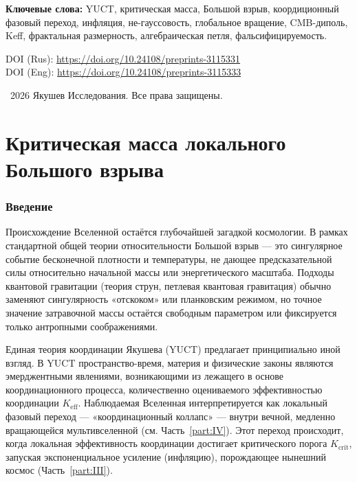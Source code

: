 \documentclass[11pt,a4paper]{article}
\begin{document}
	\vspace{0.1cm}
	\noindent
	{\color{darkblue}\textbf{Ключевые слова:}} YUCT, критическая масса, Большой взрыв, коордиционный фазовый переход, инфляция, не-гауссовость, глобальное вращение, CMB-диполь, Keff, фрактальная размерность, алгебраическая петля, фальсифицируемость.
	
	DOI (Rus): \url{https://doi.org/10.24108/preprints-3115331} \\
	DOI (Eng): \url{https://doi.org/10.24108/preprints-3115333}
	
	\vspace{0.5cm}
	\noindent
	\textcopyright\ 2026 Якушев Исследования. Все права защищены.
	
	
	\clearpage
	\tableofcontents
	\newpage
	
	\part{Критическая масса локального Большого взрыва}
	\label{part:I}
	
	\section{Введение}
	
	Происхождение Вселенной остаётся глубочайшей загадкой космологии. В рамках стандартной общей теории относительности Большой взрыв — это сингулярное событие бесконечной плотности и температуры, не дающее предсказательной силы относительно начальной массы или энергетического масштаба. Подходы квантовой гравитации (теория струн, петлевая квантовая гравитация) обычно заменяют сингулярность «отскоком» или планковским режимом, но точное значение затравочной массы остаётся свободным параметром или фиксируется только антропными соображениями.
	
	Единая теория координации Якушева (YUCT) предлагает принципиально иной взгляд. В YUCT пространство-время, материя и физические законы являются эмерджентными явлениями, возникающими из лежащего в основе координационного процесса, количественно оцениваемого эффективностью координации \(K_{\mathrm{eff}}\). Наблюдаемая Вселенная интерпретируется как локальный фазовый переход — «координационный коллапс» — внутри вечной, медленно вращающейся мультивселенной (см. Часть~\ref{part:IV}). Этот переход происходит, когда локальная эффективность координации достигает критического порога \(K_{\mathrm{crit}}\), запуская экспоненциальное усиление (инфляцию), порождающее нынешний космос (Часть~\ref{part:III}).
	
\end{document}
